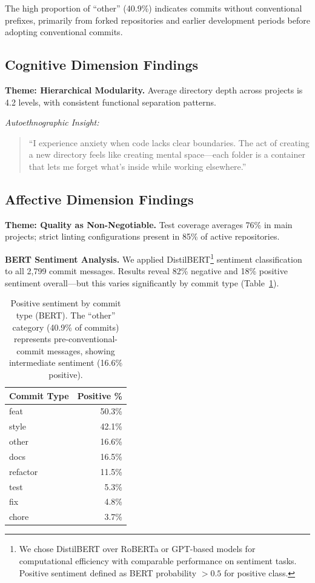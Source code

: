 \documentclass{ntlabs-preprint}
\begin{document}
The high proportion of ``other'' (40.9\%) indicates commits without conventional prefixes, primarily from forked repositories and earlier development periods before adopting conventional commits.

\subsection{Cognitive Dimension Findings}

\textbf{Theme: Hierarchical Modularity.} Average directory depth across projects is 4.2 levels, with consistent functional separation patterns.

\textit{Autoethnographic Insight:}
\begin{quote}
``I experience anxiety when code lacks clear boundaries. The act of creating a new directory feels like creating mental space---each folder is a container that lets me forget what's inside while working elsewhere.''
\end{quote}

\subsection{Affective Dimension Findings}

\textbf{Theme: Quality as Non-Negotiable.} Test coverage averages 76\% in main projects; strict linting configurations present in 85\% of active repositories.

\textbf{BERT Sentiment Analysis.} We applied DistilBERT\footnote{We chose DistilBERT over RoBERTa or GPT-based models for computational efficiency with comparable performance on sentiment tasks. Positive sentiment defined as BERT probability $>0.5$ for positive class.} sentiment classification to all 2,799 commit messages. Results reveal 82\% negative and 18\% positive sentiment overall---but this varies significantly by commit type (Table~\ref{tab:bert-sentiment}).

\begin{table}[h]
\centering
\caption{Positive sentiment by commit type (BERT). The ``other'' category (40.9\% of commits) represents pre-conventional-commit messages, showing intermediate sentiment (16.6\% positive).}
\label{tab:bert-sentiment}
\begin{tabular}{lr}
\toprule
\textbf{Commit Type} & \textbf{Positive \%} \\
\midrule
feat     & 50.3\% \\
style    & 42.1\% \\
other    & 16.6\% \\
docs     & 16.5\% \\
refactor & 11.5\% \\
test     & 5.3\% \\
fix      & 4.8\% \\
chore    & 3.7\% \\
\bottomrule
\end{tabular}
\end{table}
\end{document}
